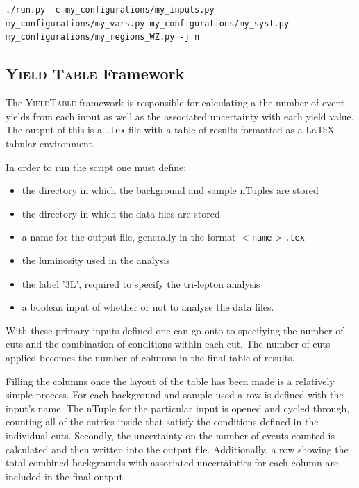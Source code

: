 \begin{center}
\texttt{./run.py -c my\_configurations/my\_inputs.py my\_configurations/my\_vars.py my\_configurations/my\_syst.py my\_configurations/my\_regions\_WZ.py -j n}
\end{center}

\subsection{Y{\scshape ield Table} Framework}

The Y{\scshape ieldTable} framework is responsible for calculating a the number of event yields from each input as well as the associated uncertainty with each yield value.
The output of this is a \texttt{.tex} file with a table of results formatted as a LaTeX tabular environment.

In order to run the script one must define:
\begin{itemize}
\item the directory in which the background and sample nTuples are stored
\item the directory in which the data files are stored
\item a name for the output file, generally in the format \texttt{$<$name$>$.tex}
\item the luminosity used in the analysis
\item the label '3L', required to specify the tri-lepton analysis
\item a boolean input of whether or not to analyse the data files.
\end{itemize}

With these primary inputs defined one can go onto to specifying the number of cuts and the combination of conditions within each cut.
The number of cuts applied becomes the number of columns in the final table of results.

Filling the columns once the layout of the table has been made is a relatively simple process.
For each background and sample used a row is defined with the input's name.
The nTuple for the particular input is opened and cycled through, counting all of the entries inside that satisfy the conditions defined in the individual cuts.
Secondly, the uncertainty on the number of events counted is calculated and then written into the output file.
Additionally, a row showing the total combined backgrounds with associated uncertainties for each column are included in the final output.
